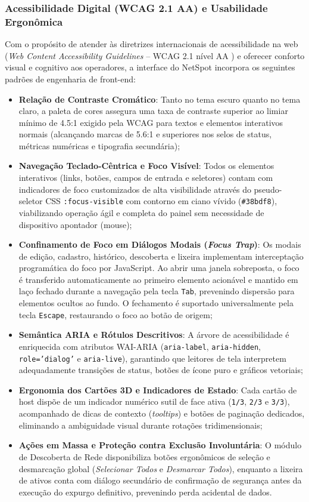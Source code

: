 \documentclass[12pt,a4paper]{article}
\begin{document}
\subsubsection{Acessibilidade Digital (WCAG 2.1 AA) e Usabilidade Ergonômica}
Com o propósito de atender às diretrizes internacionais de acessibilidade na web (\textit{Web Content Accessibility Guidelines} -- WCAG 2.1 nível AA \cite{w3c2018wcag21}) e oferecer conforto visual e cognitivo aos operadores, a interface do NetSpot incorpora os seguintes padrões de engenharia de front-end:
\begin{itemize}[leftmargin=1.25cm]
\item \textbf{Relação de Contraste Cromático}: Tanto no tema escuro quanto no tema claro, a paleta de cores assegura uma taxa de contraste superior ao limiar mínimo de 4.5:1 exigido pela WCAG para textos e elementos interativos normais (alcançando marcas de 5.6:1 e superiores nos selos de status, métricas numéricas e tipografia secundária);
\item \textbf{Navegação Teclado-Cêntrica e Foco Visível}: Todos os elementos interativos (links, botões, campos de entrada e seletores) contam com indicadores de foco customizados de alta visibilidade através do pseudo-seletor CSS \texttt{:focus-visible} com contorno em ciano vívido (\texttt{\#38bdf8}), viabilizando operação ágil e completa do painel sem necessidade de dispositivo apontador (mouse);
\item \textbf{Confinamento de Foco em Diálogos Modais (\textit{Focus Trap})}: Os modais de edição, cadastro, histórico, descoberta e lixeira implementam interceptação programática do foco por JavaScript. Ao abrir uma janela sobreposta, o foco é transferido automaticamente ao primeiro elemento acionável e mantido em laço fechado durante a navegação pela tecla \texttt{Tab}, prevenindo dispersão para elementos ocultos ao fundo. O fechamento é suportado universalmente pela tecla \texttt{Escape}, restaurando o foco ao botão de origem;
\item \textbf{Semântica ARIA e Rótulos Descritivos}: A árvore de acessibilidade é enriquecida com atributos WAI-ARIA (\texttt{aria-label}, \texttt{aria-hidden}, \texttt{role='dialog'} e \texttt{aria-live}), garantindo que leitores de tela interpretem adequadamente transições de status, botões de ícone puro e gráficos vetoriais;
\item \textbf{Ergonomia dos Cartões 3D e Indicadores de Estado}: Cada cartão de host dispõe de um indicador numérico sutil de face ativa (\texttt{1/3}, \texttt{2/3} e \texttt{3/3}), acompanhado de dicas de contexto (\textit{tooltips}) e botões de paginação dedicados, eliminando a ambiguidade visual durante rotações tridimensionais;
\item \textbf{Ações em Massa e Proteção contra Exclusão Involuntária}: O módulo de Descoberta de Rede disponibiliza botões ergonômicos de seleção e desmarcação global (\textit{Selecionar Todos} e \textit{Desmarcar Todos}), enquanto a lixeira de ativos conta com diálogo secundário de confirmação de segurança antes da execução do expurgo definitivo, prevenindo perda acidental de dados.
\end{itemize}
\end{document}
